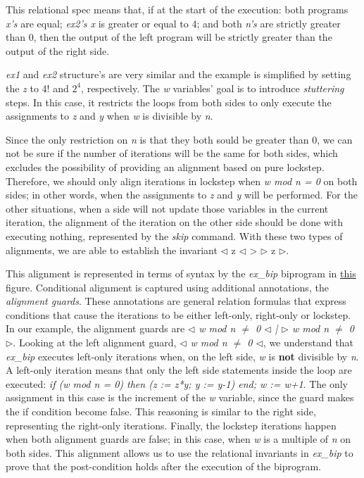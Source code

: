 This relational spec means that, if at the start of the execution: both programs \emph{x's} are equal; \emph{ex2's x} is greater or equal to 4; and both \emph{n's} are strictly greater than 0, then the output of the left program will be strictly greater than the output of the right side.

\emph{ex1} and \emph{ex2} structure's are very similar and the example is simplified by setting the \emph{z} to 4! and $2^4$, respectively.
The \emph{w} variables' goal is to introduce \emph{stuttering} steps.
In this case, it restricts the loops from both sides to only execute the assignments to \emph{z} and \emph{y} when \emph{w} is divisible by \emph{n}.

Since the only restriction on \emph{n} is that they both sould be greater than 0, we can not be sure if the number of iterations will be the same for both sides, which excludes the possibility of providing an alignment based on pure lockstep.
Therefore, we should only align iterations in lockstep when \emph{w mod n = 0} on both sides; in other words, when the assignments to \emph{z} and \emph{y} will be performed.
For the other situations, when a side will not update those variables in the current iteration, the alignment of the iteration on the other side should be done with executing nothing, represented by the \emph{skip} command.
With these two types of alignments, we are able to establish the invariant $\lhd$ z $\lhd$ > $\rhd$ z $\rhd$.

This alignment is represented in terms of syntax by the \emph{ex\_bip} biprogram in \hyperref[fig:cond_align_loops_ex]{this} figure.
Conditional alignment is captured using additional annotations, the \emph{alignment guards}.
These annotations are general relation formulas that express conditions that cause the iterations to be either left-only, right-only or lockstep.
In our example, the alignment guards are \emph{$\lhd$ w mod n $\neq$ 0 $\lhd$ | $\rhd$ w mod n $\neq$ 0 $\rhd$}.
Looking at the left alignment guard, \emph{$\lhd$ w mod n $\neq$ 0 $\lhd$}, we understand that \emph{ex\_bip} executes left-only iterations when, on the left side, \emph{w} is \textbf{not} divisible by \emph{n}. 
A left-only iteration means that only the left side statements inside the loop are executed: \emph{if (w mod n = 0) then (z := z*y; y := y-1) end; w := w+1}.
The only assignment in this case is the increment of the \emph{w} variable, since the guard makes the if condition become false.
This reasoning is similar to the right side, representing the right-only iterations.
Finally, the lockstep iterations happen when both alignment guards are false; in this case, when \emph{w} is a multiple of \emph{n} on both sides.
This alignment allows us to use the relational invariants in \emph{ex\_bip} to prove that the post-condition holds after the execution of the biprogram.


